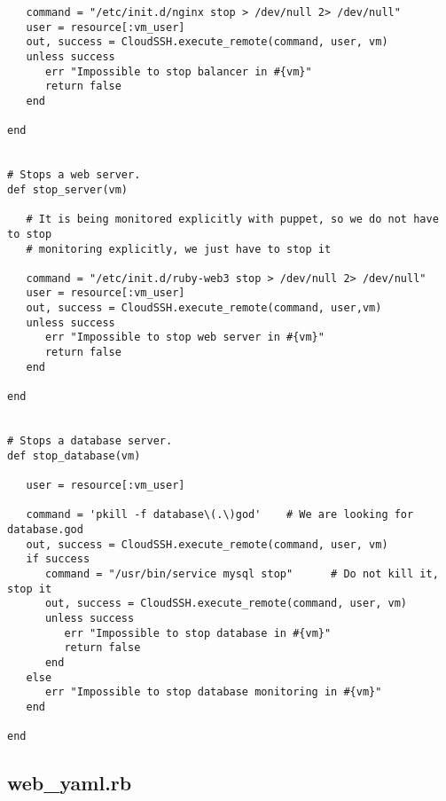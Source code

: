 \begin{lstlisting}
   command = "/etc/init.d/nginx stop > /dev/null 2> /dev/null"
   user = resource[:vm_user]
   out, success = CloudSSH.execute_remote(command, user, vm)
   unless success
      err "Impossible to stop balancer in #{vm}"
      return false
   end

end


# Stops a web server.
def stop_server(vm)

   # It is being monitored explicitly with puppet, so we do not have to stop
   # monitoring explicitly, we just have to stop it
   
   command = "/etc/init.d/ruby-web3 stop > /dev/null 2> /dev/null"
   user = resource[:vm_user]
   out, success = CloudSSH.execute_remote(command, user,vm)
   unless success
      err "Impossible to stop web server in #{vm}"
      return false
   end
   
end


# Stops a database server.
def stop_database(vm)

   user = resource[:vm_user]

   command = 'pkill -f database\(.\)god'    # We are looking for database.god
   out, success = CloudSSH.execute_remote(command, user, vm)
   if success
      command = "/usr/bin/service mysql stop"      # Do not kill it, stop it
      out, success = CloudSSH.execute_remote(command, user, vm)
      unless success
         err "Impossible to stop database in #{vm}"
         return false
      end
   else
      err "Impossible to stop database monitoring in #{vm}"
   end

end

\end{lstlisting}


\subsection{web\_yaml.rb}


